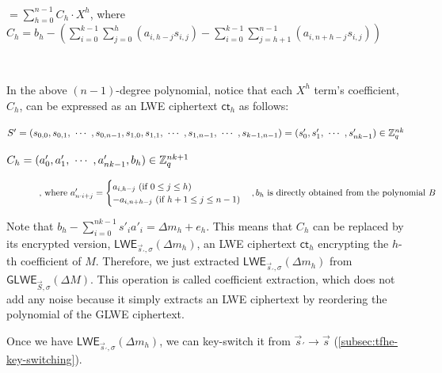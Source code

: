 $ $

$= \sum\limits_{h=0}^{n-1}  C_h \cdot X^{h}  $, where $C_h = b_h - \left(  \sum\limits_{i=0}^{k-1} \sum\limits_{j=0}^{h}(a_{i,h-j}s_{i,j}) - \sum\limits_{i=0}^{k-1} \sum\limits_{j=h+1}^{n-1}(a_{i,n+h-j}s_{i,j})  \right)$

$ $

\noindent In the above $(n-1)$-degree polynomial, notice that each $X^h$ term's coefficient, $C_h$, can be expressed as an LWE ciphertext $\textsf{ct}_h$ as follows:

$S' = (s_{0,0}, s_{0,1}, \text{ } \text{$\cdots$} \text{ }, s_{0,n-1}, s_{1,0}, s_{1,1}, \text{ } \text{$\cdots$} \text{ }, s_{1, n-1}, \text{ } \text{$\cdots$} \text{ }, s_{k-1, n-1}) = (s'_0, s'_1, \text{ } \text{$\cdots$} \text{ }, s'_{nk-1} ) \in \mathbb{Z}_q^{nk}$


$C_h = (a'_0, a'_1, \text{ } \text{$\cdots$} \text{ }, a'_{nk-1}, b_h) \in \mathbb{Z}_q^{nk + 1}$


\begin{figure}[h]
\[
    \text{, where } a'_{n \cdot i + j} =   
\begin{cases}
    a_{i,h - j} \text{ (if } 0 \leq j \leq h\text{)}\\
    -a_{i,n + h - j} \text{ (if } h+1 \leq j \leq n-1\text{)}\\
\end{cases}
\centering , b_h \text{ is directly obtained from the polynomial } B
\]
\end{figure}

\noindent Note that $b_h - \sum\limits_{i=0}^{nk-1}s'_ia'_i = \Delta m_h + e_h$. This means that $C_h$ can be replaced by its encrypted version, $\textsf{LWE}_{\vec{s}_{'}, \sigma}(\Delta m_h)$, an LWE ciphertext $\textsf{ct}_h$ encrypting the $h$-th coefficient of $M$. Therefore, we just extracted $\textsf{LWE}_{\vec{s}_{'}, \sigma}(\Delta m_h)$ from $\textsf{GLWE}_{\vec{S}, \sigma}(\Delta M)$. This operation is called coefficient extraction, which does not add any noise because it simply extracts an LWE ciphertext by reordering the polynomial of the GLWE ciphertext. 

Once we have $\textsf{LWE}_{\vec{s}_{'}, \sigma}(\Delta m_h)$, we can key-switch it from $\vec{s}_{'} \rightarrow \vec{s}$ (\autoref{subsec:tfhe-key-switching}). 

